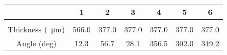 \documentclass{standalone}
\begin{document}
    \begin{tabular}{c c c c c c c}
        \toprule
        & 1 & 2 & 3 & 4 & 5 & 6 \\ 
        \midrule\\
        \addlinespace[-2ex]
        Thickness (\SI{}{\micro \meter}) & 566.0 & 377.0 & 377.0 & 377.0 & 377.0 & 377.0  \\
        \addlinespace[1.5ex]
        Angle (deg) & 12.3 & 56.7 & 28.1 & 356.5 & 302.0 & 349.2 \\
        \bottomrule
    \end{tabular}
\end{document}
